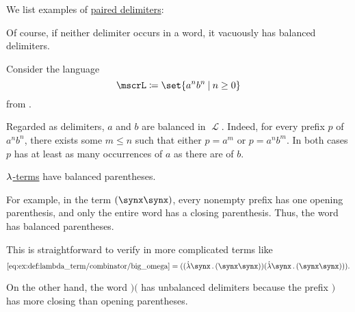 \begin{example}\label{ex:def:paired_delimiters}
  We list examples of \hyperref[def:paired_delimiters]{paired delimiters}:
  \begin{thmenum}
     Of course, if neither delimiter occurs in a word, it vacuously has balanced delimiters.

     Consider the language
    \begin{equation*}
      \mscrL \coloneqq \set{ a^n b^n \given n \geq 0 }
    \end{equation*}
    from .

    Regarded as delimiters, \( a \) and \( b \) are balanced in \( \mscrL \). Indeed, for every prefix \( p \) of \( a^n b^n \), there exists some \( m \leq n \) such that either \( p = a^m \) or \( p = a^n b^m \). In both cases \( p \) has at least as many occurrences of \( a \) as there are of \( b \).

     \hyperref[def:lambda_term]{\( {\mathrm \lambda} \)-terms} have balanced parentheses.

    For example, in the term \( (\synx \synx) \), every nonempty prefix has one opening parenthesis, and only the entire word has a closing parenthesis. Thus, the word has balanced parentheses.

    This is straightforward to verify in more complicated terms like
    \begin{equation*}
      \ref{eq:ex:def:lambda_term/combinator/big_omega} = ((\qabs \synx (\synx \synx)) (\qabs \synx (\synx \synx))).
    \end{equation*}

     On the other hand, the word \( )( \) has unbalanced delimiters because the prefix \( ) \) has more closing than opening parentheses.
  \end{thmenum}
\end{example}

